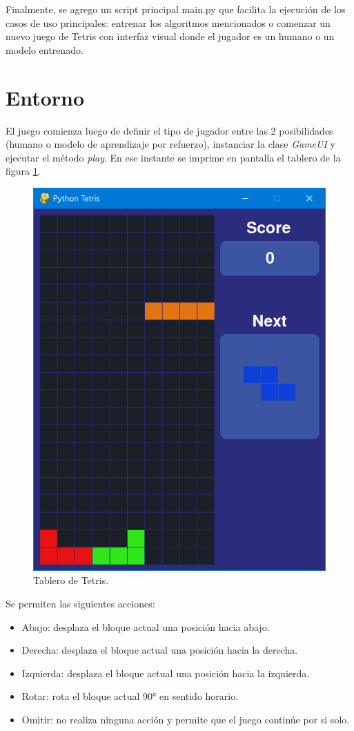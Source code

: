 Finalmente, se agrego un script principal main.py que facilita la ejecución de los casos de uso principales: entrenar los algoritmos mencionados o comenzar un nuevo juego de Tetris con interfaz visual donde el jugador es un humano o un modelo entrenado.

\section{Entorno}
\label{sec:entorno}

El juego comienza luego de definir el tipo de jugador entre las 2 posibilidades (humano o modelo de aprendizaje por refuerzo), instanciar la clase \textit{GameUI} y ejecutar el método \textit{play}. En ese instante se imprime en pantalla el tablero de la figura \ref{fig:board}. 

\begin{figure}[htbp]
	\centering
	\includegraphics[width=.5\textwidth]{./Figures/tetris.png}
	\caption{Tablero de Tetris.}
	\label{fig:board}
\end{figure}

Se permiten las siguientes acciones:
\begin{itemize}
    \item Abajo: desplaza el bloque actual una posición hacia abajo.
    \item Derecha: desplaza el bloque actual una posición hacia la derecha.
    \item Izquierda: desplaza el bloque actual una posición hacia la izquierda.
    \item Rotar: rota el bloque actual 90° en sentido horario.
    \item Omitir: no realiza ninguna acción y permite que el juego continúe por si solo.
\end{itemize}

